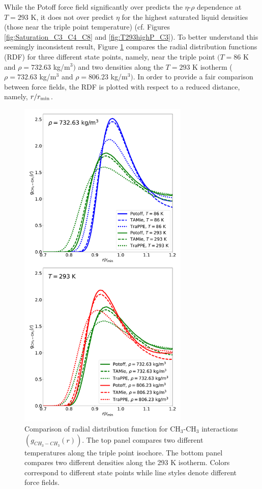 \documentclass[preprint,review,12pt]{elsarticle}
\begin{document}
	While the Potoff force field significantly over predicts the $\eta$-$\rho$ dependence at $T= 293$ K, it does not over predict $\eta$ for the highest saturated liquid densities (those near the triple point temperature) (cf. Figures \ref{fig:Saturation_C3_C4_C8} and \ref{fig:T293highP_C3}). To better understand this seemingly inconsistent result, Figure \ref{fig:RDF_comparison_CH3} compares the radial distribution functions (RDF) for three different state points, namely, near the triple point $(T=86$ K and $\rho = 732.63$ kg/m$^3)$ and two densities along the $T = 293$ K isotherm ($\rho = 732.63$ kg/m$^3$ and $\rho = 806.23$ kg/m$^3)$. In order to provide a fair comparison between force fields, the RDF is plotted with respect to a reduced distance, namely, $r/r_{\rm min}$.
	
	
	\begin{figure}[htb!]
		\centering
		\includegraphics[width=3.2in]{RDF_comparison_CH3.pdf}
		\caption{Comparison of radial distribution function for CH$_3$-CH$_3$ interactions $(g_{CH_3-CH_3}(r))$. The top panel compares two different temperatures along the triple point isochore. The bottom panel compares two different densities along the 293 K isotherm. Colors correspond to different state points while line styles denote different force fields.}
		\label{fig:RDF_comparison_CH3}
	\end{figure} 
	
\end{document}
